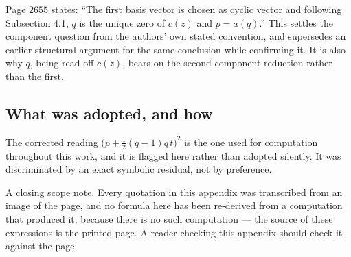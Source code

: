 \begin{remark}
Page $2655$ states: ``The first basis vector is chosen as cyclic vector and
following Subsection 4.1, $q$ is the unique zero of $c(z)$ and $p=a(q)$.'' This
settles the component question from the authors' own stated convention, and
supersedes an earlier structural argument for the same conclusion while
confirming it. It is also why $q$, being read off $c(z)$, bears on the
second-component reduction rather than the first.
\end{remark}

\subsection{What was adopted, and how}\label{ssec:typo-adopted}

\begin{remark}
The corrected reading $\bigl(p+\tfrac12(q-1)q\,t\bigr)^{2}$ is the one used for
computation throughout this work, and it is flagged here rather than adopted
silently. It was discriminated by an exact symbolic residual, not by
preference.
\end{remark}

A closing scope note. Every quotation in this appendix was transcribed from an
image of the page, and no formula here has been re-derived from a computation
that produced it, because there is no such computation --- the source of these
expressions is the printed page. A reader checking this appendix should check
it against the page.
